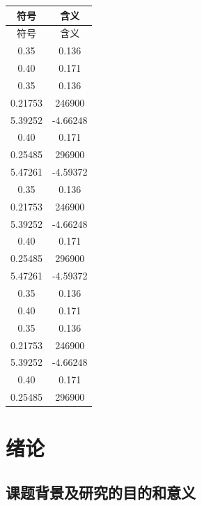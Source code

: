 \documentclass[a4paper, twoside, openany]{NCEPUDoctor}
\begin{document}
  \begin{longtable}{ C{0.4} C{0.6}}
  \toprule[1.5pt]
  符号 & 含义 \\  %
  \midrule[1pt]
  \endfirsthead

  \toprule[1.5pt]
  符号 & 含义 \\ %
  \midrule[1pt]
  \endhead

  \bottomrule[1.5pt]
  \endfoot

  0.35 & 0.136 \\
  0.40 & 0.171 \\
  0.35 & 0.136 \\
  0.21753 & 246900 \\
  5.39252 & -4.66248 \\
  0.40 & 0.171 \\
  0.25485 & 296900 \\
  5.47261 & -4.59372 \\
  0.35 & 0.136 \\
  0.21753 & 246900 \\
  5.39252 & -4.66248 \\
  0.40 & 0.171 \\
  0.25485 & 296900 \\
  5.47261 & -4.59372 \\
  0.35 & 0.136 \\
  0.40 & 0.171 \\
  0.35 & 0.136 \\
  0.21753 & 246900 \\
  5.39252 & -4.66248 \\
  0.40 & 0.171 \\
  0.25485 & 296900 \\

  \end{longtable}
  \clearpage


  \clearpage
  \setcounter{page}{1} %

  \chapter{绪论} %

  \section{课题背景及研究的目的和意义} %
\end{document}
